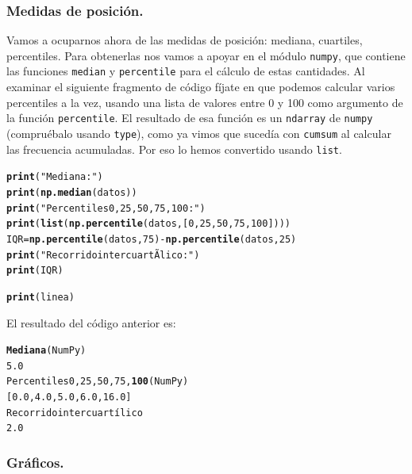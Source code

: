 \documentclass[10pt,a4paper]{article}\usepackage[]{graphicx}\usepackage[]{color}
\makeatletter
\newcommand{\hlstr}[1]{\textcolor[rgb]{0.192,0.494,0.8}{#1}}%
\newcommand{\hlkwd}[1]{\textcolor[rgb]{0.737,0.353,0.396}{\textbf{#1}}}%
\newenvironment{kframe}{%
 \def\at@end@of@kframe{}%
 \ifinner\ifhmode%
  \def\at@end@of@kframe{\end{minipage}}%
  \begin{minipage}{\columnwidth}%
 \fi\fi%
 \def\FrameCommand##1{\hskip\@totalleftmargin \hskip-\fboxsep
 \colorbox{shadecolor}{##1}\hskip-\fboxsep
     \hskip-\linewidth \hskip-\@totalleftmargin \hskip\columnwidth}%
 \MakeFramed {\advance\hsize-\width
   \@totalleftmargin\z@ \linewidth\hsize
   \@setminipage}}%
 {\par\unskip\endMakeFramed%
 \at@end@of@kframe}
\newenvironment{knitrout}{}{} %
\newcounter {cont01}
\makeatother
\begin{document}
\subsubsection*{Medidas de posición.}
\label{tut02:subsubsec:medidasPosicion}

Vamos a ocuparnos ahora de las medidas de posición: mediana, cuartiles, percentiles. Para obtenerlas nos vamos a apoyar en el módulo {\tt numpy}, que contiene las funciones {\tt median} y {\tt percentile} para el cálculo de estas cantidades. Al examinar el siguiente fragmento de código fíjate en que podemos calcular varios percentiles a la vez, usando una lista de valores entre 0 y 100 como argumento de la función {\tt percentile}. El resultado de esa función es un {\tt ndarray} de {\tt numpy} (compruébalo usando {\tt type}), como ya vimos que sucedía con {\tt cumsum} al calcular las frecuencia acumuladas. Por eso lo hemos convertido usando {\tt list}.
\begin{knitrout}
\color{fgcolor}\begin{kframe}
\begin{alltt}
\hlkwd{print}(\hlstr{"Mediana:"})
\hlkwd{print}(\hlkwd{np.median}(datos))
\hlkwd{print}(\hlstr{"Percentiles 0, 25, 50, 75, 100:"})
\hlkwd{print}(\hlkwd{list}(\hlkwd{np.percentile}(datos, [0, 25, 50, 75, 100])))
IQR = \hlkwd{np.percentile}(datos, 75) - \hlkwd{np.percentile}(datos, 25)
\hlkwd{print}(\hlstr{"Recorrido intercuartÃ­lico:"})
\hlkwd{print}(IQR)

\hlkwd{print}(linea)
\end{alltt}
\end{kframe}
\end{knitrout}
El resultado del código anterior es:

\begin{knitrout}
\color{fgcolor}\begin{kframe}
\begin{alltt}
\hlkwd{Mediana} (NumPy)
5.0
Percentiles 0, 25, 50, 75, \hlkwd{100}  (NumPy)
[0.0, 4.0, 5.0, 6.0, 16.0]
Recorrido intercuartílico
2.0
\end{alltt}
\end{kframe}
\end{knitrout}

\subsubsection*{Gráficos.}
\label{tut02:subsubsec:graficos}
\end{document}
